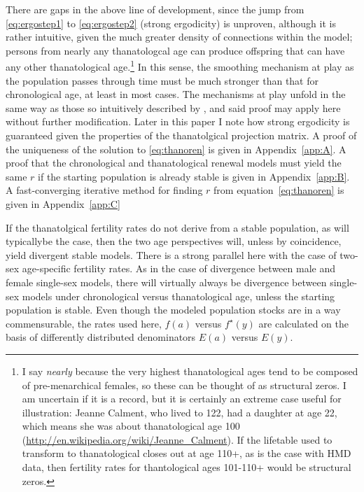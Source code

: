 \documentclass{article}
\begin{document}
There are gaps in the above line of development, since the jump from
\eqref{eq:ergostep1} to \eqref{eq:ergostep2} (strong ergodicity) is unproven,
although it is rather intuitive, given the much greater density of connections
within the model; persons from nearly any thanatologcal age can produce offspring that can have any other thanatological age.\footnote{I say
\textit{nearly} because the very highest thanatological ages tend to be
composed of pre-menarchical females, so these can be thought of as structural
zeros. I am uncertain if it is a record, but it is certainly an extreme case
useful for illustration: Jeanne Calment, who lived to 122, had a daughter at age
22, which means she was about thanatological age 100
(\url{http://en.wikipedia.org/wiki/Jeanne_Calment}). If the lifetable used to
transform to thanatological closes out at age 110+, as is the case with HMD data, then fertility rates for thantological ages 101-110+ would be structural
zeros.} In
this sense, the smoothing mechanism at play as the population passes through
time must be much stronger than that for chronological age, at least in most
cases.  The mechanisms at play unfold in the same way as those so intuitively
described by \citet{arthur1982ergodic}, and said proof may apply here without
further modification. Later in this paper I note how strong ergodicity is
guaranteed given the properties of the thanatolgical projection matrix. A proof
of the uniqueness of the solution to \eqref{eq:thanoren} is given in
Appendix~\ref{app:A}. A proof that the chronological and thanatological renewal
models must yield the same $r$ if the starting population is already stable is
given in Appendix~\ref{app:B}. A fast-converging iterative method for finding
$r$ from equation~\eqref{eq:thanoren} is given in Appendix~\ref{app:C}

If the thanatolgical fertility rates do not derive from a stable
population, as will typicallybe the case, then the two age perspectives
will, unless by coincidence, yield divergent stable models. There is a strong
parallel here with the case of two-sex age-specific fertility rates. As in the
case of divergence between male and female single-sex models, there will
virtually always be divergence between single-sex models under chronological
versus thanatological age, unless the starting population is stable. Even though the modeled population stocks are in a way commensurable, the rates used here, $f(a)$ versus $f^\star(y)$ are calculated on the basis of differently distributed denominators $E(a)$ versus $E(y)$.
\end{document}
